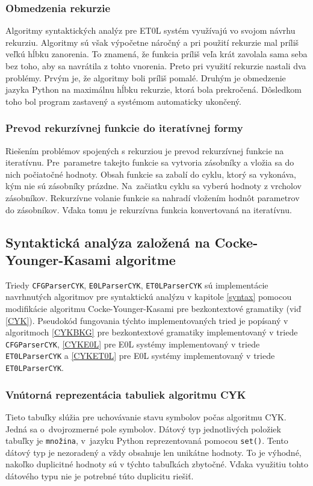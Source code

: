 \subsubsection{Obmedzenia rekurzie}
Algoritmy syntaktických analýz pre ET0L systém využívajú vo svojom návrhu rekurziu. Algoritmy sú však výpočetne náročný a pri použití rekurzie mal príliš veľkú hĺbku zanorenia. To znamená, že funkcia príliš veľa krát zavolala sama seba bez toho, aby sa navrátila z tohto vnorenia. Preto pri využití rekurzie nastali dva problémy. Prvým je, že algoritmy boli príliš pomalé. Druhým je obmedzenie jazyka Python na maximálnu hĺbku rekurzie, ktorá bola prekročená. Dôsledkom toho bol program zastavený a systémom automaticky ukončený.

\subsubsection{Prevod rekurzívnej funkcie do iteratívnej formy}
Riešením problémov spojených s rekurziou je prevod rekurzívnej funkcie na iteratívnu. Pre~parametre takejto funkcie sa vytvoria zásobníky a vložia sa do nich počiatočné hodnoty.  Obsah funkcie sa zabalí do cyklu, ktorý sa vykonáva, kým nie sú zásobníky prázdne. Na~začiatku cyklu sa vyberú hodnoty z vrcholov zásobníkov. Rekurzívne volanie funkcie sa nahradí vložením hodnôt parametrov do zásobníkov. Vďaka tomu je rekurzívna funkcia konvertovaná na iteratívnu.

\subsection{Syntaktická analýza založená na Cocke-Younger-Kasami algoritme}


Triedy \texttt{CFGParserCYK}, \texttt{E0LParserCYK}, \texttt{ET0LParserCYK} sú implementácie navrhnutých algoritmov pre syntaktickú analýzu v kapitole \ref{syntax} pomocou modifikácie algoritmu Cocke-Younger-Kasami pre bezkontextové gramatiky (viď \ref{CYK}). Pseudokód fungovania týchto implementovaných tried je popísaný v algoritmoch \ref{CYKBKG} pre bezkontextové gramatiky implementovaný v triede \texttt{CFGParserCYK}, \ref{CYKE0L} pre E0L systémy implementovaný v triede \texttt{ET0LParserCYK} a \ref{CYKET0L} pre E0L systémy implementovaný v triede \texttt{ET0LParserCYK}.


\subsubsection*{Vnútorná reprezentácia tabuliek algoritmu CYK}
Tieto tabuľky slúžia pre uchovávanie stavu symbolov počas algoritmu CYK. Jedná sa o~dvojrozmerné pole symbolov. Dátový typ jednotlivých položiek tabuľky je \texttt{množina}, v~jazyku Python reprezentovaná pomocou \texttt{set()}. Tento dátový typ je nezoradený a vždy obsahuje len unikátne hodnoty. To je výhodné, nakoľko duplicitné hodnoty sú v týchto tabuľkách zbytočné. Vďaka využitiu tohto dátového typu nie je potrebné túto duplicitu riešiť.

